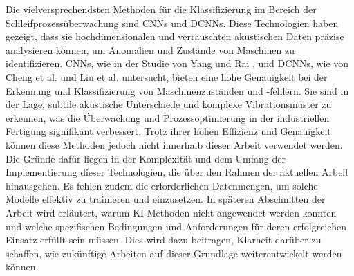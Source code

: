 Die vielversprechendsten Methoden für die Klassifizierung im Bereich der Schleifprozessüberwachung sind \acp{CNN} und \acp{DCNN}. Diese Technologien haben gezeigt, dass sie hochdimensionalen und verrauschten akustischen Daten präzise analysieren können, um Anomalien und Zustände von Maschinen zu identifizieren. \acp{CNN}, wie in der Studie von Yang und Rai \cite{Yang2019}, und \acp{DCNN}, wie von Cheng et al. \cite{Cheng2018} und Liu et al. \cite{Liu2022} untersucht, bieten eine hohe Genauigkeit bei der Erkennung und Klassifizierung von Maschinenzuständen und -fehlern. Sie sind in der Lage, subtile akustische Unterschiede und komplexe Vibrationsmuster zu erkennen, was die Überwachung und Prozessoptimierung in der industriellen Fertigung signifikant verbessert. Trotz ihrer hohen Effizienz und Genauigkeit können diese Methoden jedoch nicht innerhalb dieser Arbeit verwendet werden. Die Gründe dafür liegen in der Komplexität und dem Umfang der Implementierung dieser Technologien, die über den Rahmen der aktuellen Arbeit hinausgehen. Es fehlen zudem die erforderlichen Datenmengen, um solche Modelle effektiv zu trainieren und einzusetzen.
In späteren Abschnitten der Arbeit wird erläutert, warum KI-Methoden nicht angewendet werden konnten und welche spezifischen Bedingungen und Anforderungen für deren erfolgreichen Einsatz erfüllt sein müssen. Dies wird dazu beitragen, Klarheit darüber zu schaffen, wie zukünftige Arbeiten auf dieser Grundlage weiterentwickelt werden können.
    
    
    
\endinput
